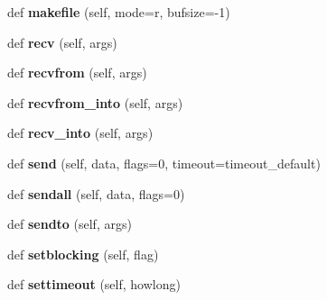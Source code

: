 \begin{DoxyCompactItemize}
def {\bfseries makefile} (self, mode=\textquotesingle{}r\textquotesingle{}, bufsize=-\/1)
\item 
\mbox{\label{classgevent_1_1__socket2_1_1socket_a7654da1679aec74e1b8d835813a44921}} 
def {\bfseries recv} (self, args)
\item 
\mbox{\label{classgevent_1_1__socket2_1_1socket_ac1f52b4bf65dd5fb62047bd98bef3d06}} 
def {\bfseries recvfrom} (self, args)
\item 
\mbox{\label{classgevent_1_1__socket2_1_1socket_adbd4180f5430b1f40d02e604e4308969}} 
def {\bfseries recvfrom\+\_\+into} (self, args)
\item 
\mbox{\label{classgevent_1_1__socket2_1_1socket_ad474fdf3c4c3ff865bbf863c59bdb546}} 
def {\bfseries recv\+\_\+into} (self, args)
\item 
\mbox{\label{classgevent_1_1__socket2_1_1socket_a31f0b110804f05174df398e58ea4678f}} 
def {\bfseries send} (self, data, flags=0, timeout=timeout\+\_\+default)
\item 
\mbox{\label{classgevent_1_1__socket2_1_1socket_a40ca4b48e980132884fe163632a66d7c}} 
def {\bfseries sendall} (self, data, flags=0)
\item 
\mbox{\label{classgevent_1_1__socket2_1_1socket_afb938baa21649eeb7ac19643aad6eac5}} 
def {\bfseries sendto} (self, args)
\item 
\mbox{\label{classgevent_1_1__socket2_1_1socket_a5a0f3f27c7d6b56848199b47559029a6}} 
def {\bfseries setblocking} (self, flag)
\item 
\mbox{\label{classgevent_1_1__socket2_1_1socket_ae6b1f84c133727e326a28b2332cff1fd}} 
def {\bfseries settimeout} (self, howlong)
\item 
\mbox{\label{classgevent_1_1__socket2_1_1socket_afd27718d10675f5c9539c9771c4c1bdc}} 

\end{DoxyCompactItemize}
